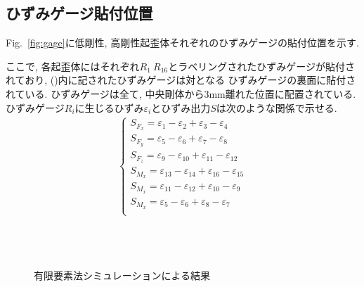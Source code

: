 \subsection{ひずみゲージ貼付位置}\label{sec:hizumiharituke}
Fig.~\ref{fig:gage}に低剛性, 高剛性起歪体それぞれのひずみゲージの貼付位置を示す. 

ここで, 各起歪体にはそれぞれ$R_1~R_{16}$とラベリングされたひずみゲージが貼付されており, ()内に記されたひずみゲージは対となる
ひずみゲージの裏面に貼付されている. ひずみゲージは全て, 中央剛体から3mm離れた位置に配置されている.
ひずみゲージ$R_i$に生じるひずみ${\varepsilon} _i$とひずみ出力$S$は次のような関係で示せる. 
\begin{eqnarray}
  \left\{
    \begin{array}{l}
      S_{F_{x}} = \varepsilon _1 - \varepsilon _2 + \varepsilon _3 -\varepsilon _4 \\
      S_{F_{y}} = \varepsilon _5 - \varepsilon _6 + \varepsilon _7 -\varepsilon _8 \\
      S_{F_{z}} = \varepsilon _9 - \varepsilon _{10} + \varepsilon _{11} -\varepsilon _{12} \\
      S_{M_{x}} = \varepsilon _{13} - \varepsilon _{14} + \varepsilon _{16} -\varepsilon _{15} \\
      S_{M_{x}} = \varepsilon _{11} - \varepsilon _{12} + \varepsilon _{10} -\varepsilon _9 \\
      S_{M_{x}} = \varepsilon _5 - \varepsilon _6 + \varepsilon _8 -\varepsilon _7 \\
    \end{array}
  \right.\\ \nonumber
\end{eqnarray}
\begin{figure}[b]
  \centering
  \\
  \\
  \caption[]{有限要素法シミュレーションによる結果}\label{fig:sim}
\end{figure}
